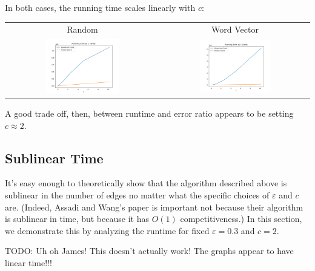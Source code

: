 \documentclass[
]{article}
\begin{document}
In both cases, the running time scales linearly with {\(c\)}:

\begin{tabular}{cc}
  Random & Word Vector\\
  \includegraphics[width=0.5\textwidth]{images/running_time_as_c_varies.png}
         &
  \includegraphics[width=0.5\textwidth]{images/running_time_as_c_varies_word_vector.png}\\
\end{tabular}

A good trade off, then, between runtime and error ratio appears to be
setting {\(c \approx 2\)}.

\hypertarget{sublinear-time}{%
  \subsection{Sublinear Time}\label{sublinear-time}}

It's easy enough to theoretically show that the
algorithm described above is sublinear in the number of edges no matter
what the specific choices of {\(\varepsilon\)} and {\(c\)} are. (Indeed,
Assadi and Wang's paper is important not because their
algorithm is sublinear in time, but because it has {\(O(1)\)}
competitiveness.) In this section, we demonstrate this by analyzing the
runtime for fixed {\(\varepsilon = 0.3\)} and {\(c = 2\)}.

TODO: Uh oh James! This doesn't actually work! The
graphs appear to have linear time!!!
\end{document}
